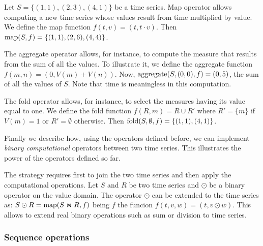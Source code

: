 


\begin{example}
\label{ex:computational-operators}
Let $S=\{(1,1),(2,3),(4,1)\}$ be a time series.  Map operator allows
computing a new time series whose values result from time multiplied
by value.  We define the map function $f(t,v)=(t,t\cdot v)$. Then
$\operatorname*{map}(S,f)=\{(1,1),(2,6),(4,4)\}$.  
%

The aggregate operator allows, for instance, to compute the measure
that results from the sum of all the values.  To illustrate it, we
define the aggregate function $f(m,n)=(0,V(m)+V(n))$. Now,
$\operatorname*{aggregate}(S,(0,0),f) = (0,5)$, the sum of all the values of $S$. Note that
time is meaningless in this computation.

The fold operator allows, for instance, to select the measures having
its value equal to one.  We define the fold function $f(R,m)=R\cup R'$
where $R'=\{m\}$ if $V(m)=1$ or $R'=\emptyset$ otherwise. Then
$\operatorname*{fold}(S,\emptyset,f)=\{(1,1),(4,1)\}$.
\end{example}


Finally we describe how, using the operators defined before, we can
implement \emph{binary computational} operators between two time
series. This illustrates the power of the operators defined so far.
%

The strategy requires first to join the two time series and then
apply the computational operations. 
%
Let $S$ and $R$ be two time series and $\odot$ be a binary operator on
the value domain. The operator $\odot$ can be extended to the time
series as:
%
$S\odot R=\operatorname*{map}(S\Join R, f)$ being $f$ the funcion
$f(t,v,w)=(t,v\odot w)$.
%
This allows to extend real binary operations such as sum or division
to time series.  


\subsubsection{Sequence operations}

